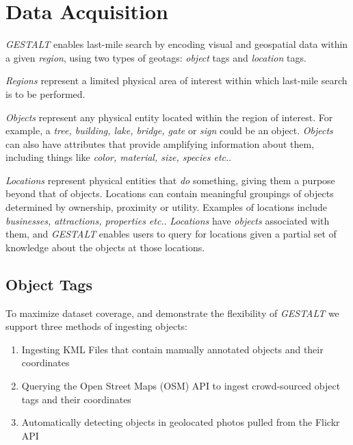 \section{Data Acquisition}
\label{section:data}

\emph{GESTALT} enables last-mile search by encoding visual and geospatial data within a given \emph{region}, using two types of geotags: \emph{object} tags and \emph{location} tags.

\emph{Regions} represent a limited physical area of interest within which last-mile search is to be performed. 


\emph{Objects} represent any physical entity located within the region of interest. For example, a \textit{tree, building, lake, bridge, gate} or \textit{sign} could be an object. \textit{Objects} can also have attributes that provide amplifying information about them, including things like \textit{color, material, size, species etc.}. 

\emph{Locations} represent physical entities that \textit{do} something, giving them a purpose beyond that of objects. Locations can contain meaningful groupings of objects determined by ownership, proximity or utility. Examples of locations include \textit{businesses, attractions, properties etc.}. \textit{Locations} have \textit{objects} associated with them, and \emph{GESTALT} enables users to query for locations given a partial set of knowledge about the objects at those locations.

\subsection{Object Tags}
To maximize dataset coverage, and demonstrate the flexibility of \emph{GESTALT} we support three methods of ingesting objects:
\begin{enumerate}
    \item Ingesting KML Files that contain manually annotated objects and their coordinates 
    \item Querying the Open Street Maps (OSM) API to ingest crowd-sourced object tags and their coordinates
    \item Automatically detecting objects in geolocated photos pulled from the Flickr API 
\end{enumerate}

